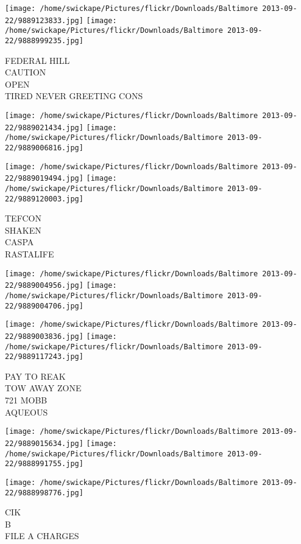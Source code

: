 \documentclass[10pt,letterpaper]{article}
\begin{document}
\texttt{[image: /home/swickape/Pictures/flickr/Downloads/Baltimore 2013-09-22/9889123833.jpg]}
\texttt{[image: /home/swickape/Pictures/flickr/Downloads/Baltimore 2013-09-22/9888999235.jpg]}

FEDERAL HILL\\
CAUTION\\
OPEN\\
TIRED NEVER GREETING CONS
\pagebreak

\texttt{[image: /home/swickape/Pictures/flickr/Downloads/Baltimore 2013-09-22/9889021434.jpg]}
\texttt{[image: /home/swickape/Pictures/flickr/Downloads/Baltimore 2013-09-22/9889006816.jpg]}

\texttt{[image: /home/swickape/Pictures/flickr/Downloads/Baltimore 2013-09-22/9889019494.jpg]}
\texttt{[image: /home/swickape/Pictures/flickr/Downloads/Baltimore 2013-09-22/9889120003.jpg]}

TEFCON\\
SHAKEN\\
CASPA\\
RASTALIFE
\pagebreak

\texttt{[image: /home/swickape/Pictures/flickr/Downloads/Baltimore 2013-09-22/9889004956.jpg]}
\texttt{[image: /home/swickape/Pictures/flickr/Downloads/Baltimore 2013-09-22/9889004706.jpg]}

\texttt{[image: /home/swickape/Pictures/flickr/Downloads/Baltimore 2013-09-22/9889003836.jpg]}
\texttt{[image: /home/swickape/Pictures/flickr/Downloads/Baltimore 2013-09-22/9889117243.jpg]}

PAY TO REAK\\
TOW AWAY ZONE\\
721 MOBB\\
AQUEOUS
\pagebreak

\texttt{[image: /home/swickape/Pictures/flickr/Downloads/Baltimore 2013-09-22/9889015634.jpg]}
\texttt{[image: /home/swickape/Pictures/flickr/Downloads/Baltimore 2013-09-22/9888991755.jpg]}

\vspace{0.25in}
\texttt{[image: /home/swickape/Pictures/flickr/Downloads/Baltimore 2013-09-22/9888998776.jpg]}

CIK\\
B\\
FILE A CHARGES
\pagebreak
\end{document}
